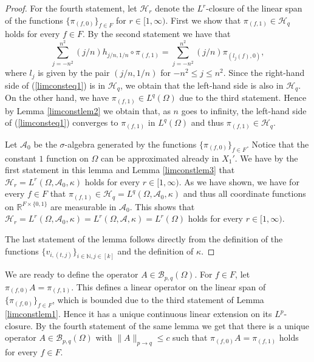 \documentclass[a4wider]{amsart}
\theoremstyle{definitionbreak}\newtheorem{D}[theorem]{Definition}
\theoremstyle{definitionbreak}\newtheorem*{D*}{Definition}
\begin{document}
\begin{proof}
For the fourth statement, let $\mathcal{H}_r$ denote the $L^r$-closure of the linear span of the functions $\{\pi_{(f,0)}\}_{f\in F}$ for $r\in [1,\infty)$. First we show that $\pi_{(f,1)}\in \mathcal{H}_q$ holds for every $f\in F$. By the second statement we have that
\begin{equation}\label{limconsteq1}
\sum_{j=-n^2}^{n^2} (j/n)h_{j/n,1/n}\circ \pi_{(f,1)}=\sum_{j=-n^2}^{n^2} (j/n) \pi_{(l_j(f),0)},
\end{equation}
 where $l_j$ is given by the pair $(j/n,1/n)$ for $-n^2\leq j\leq n^2$. Since the right-hand side of (\ref{limconsteq1}) is in $\mathcal{H}_q$, we obtain that the left-hand side is also in $\mathcal{H}_q$. On the other hand, we have $\pi_{(f,1)}\in L^q(\Omega)$ due to the third statement.  Hence by Lemma \ref{limconstlem2} we obtain that, as $n$ goes to infinity, the left-hand side of (\ref{limconsteq1}) converges to $\pi_{(f,1)}$ in $L^q(\Omega)$ and thus $\pi_{(f,1)}\in \mathcal{H}_q$.
 
Let $\mathcal{A}_0$ be the $\sigma$-algebra generated by the functions $\{\pi_{(f,0)}\}_{f\in F}$. Notice that the constant $1$ function on $\Omega$ can be approximated already in $X_1'$. We have by the first statement in this lemma and Lemma \ref{limconstlem3} that $\mathcal{H}_r=L^r(\Omega,\mathcal{A}_0,\kappa)$ holds for every $r\in [1,\infty)$. As we have shown, we have for every $f\in F$ that $\pi_{(f,1)}\in \mathcal{H}_q=L^q(\Omega,\mathcal{A}_0,\kappa)$ and thus all coordinate functions on $\mathbb{R}^{F\times\{0,1\}}$ are measurable in $\mathcal{A}_0$. This shows that $\mathcal{H}_r=L^r(\Omega,\mathcal{A}_0,\kappa)=L^r(\Omega,\mathcal{A},\kappa)=L^r(\Omega)$ holds for every $r\in [1,\infty)$.

The last statement of the lemma follows directly from the definition of the functions $\{v_{i,(t,j)}\}_{i\in\mathbb{N},j\in [k]}$ and the definition of $\kappa$.
\end{proof}

We are ready to define the operator $A\in\mathcal{B}_{p,q}(\Omega)$. For $f\in F$, let $\pi_{(f,0)}A=\pi_{(f,1)}$. This defines a linear operator on the linear span of $\{\pi_{(f,0)}\}_{f\in F}$, which is bounded due to the third statement of Lemma \ref{limconstlem1}. Hence it has a unique continuous linear extension on its $L^p$-closure. By the fourth statement of the same lemma we get that there is a unique operator $A\in\mathcal{B}_{p,q}(\Omega)$ with $\|A\|_{p\to q}\leq c$ such that $\pi_{(f,0)}A=\pi_{(f,1)}$ holds for every $f\in F$.
\end{document}
